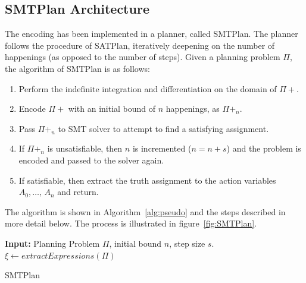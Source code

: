\subsection{SMTPlan Architecture} \label{sssec:SMTPlan_Archi}

The encoding has been implemented in a planner, called SMTPlan. The planner follows the procedure of SATPlan, iteratively deepening on the number of happenings (as opposed to the number of steps). Given a planning problem $\Pi$, the algorithm of SMTPlan is as follows:

\begin{enumerate}
\item
Perform the indefinite integration and differentiation on the domain of $\Pi+$.
\item
Encode $\Pi+$ with an initial bound of $n$ happenings, as $\Pi+_n$.
\item
Pass $\Pi+_n$ to SMT solver to attempt to find a satisfying assignment.
\item
If $\Pi+_n$ is unsatisfiable, then $n$ is incremented ($n=n+s$) and the problem is encoded and passed to the solver again.
\item
If satisfiable, then extract the truth assignment to the action variables $A_0, \ldots,\, A_n$ and return.
\end{enumerate}
The algorithm is shown in Algorithm~\ref{alg:pseudo} and the steps described in more detail below. The process is illustrated in figure~\ref{fig:SMTPlan}.

\begin{algorithm}
\SetAlgoLined
\textbf{Input:} Planning Problem $\Pi$, initial bound $n$, step size $s$.\\
$\xi \leftarrow extractExpressions(\Pi)$
\caption{SMTPlan}
\label{alg:pseudo}
\end{algorithm}

